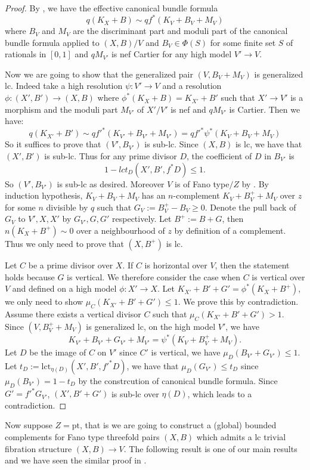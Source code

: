 \documentclass[letterpaper,reqno,12pt]{amsart}
\numberwithin{equation}{section}
\theoremstyle{plain}
\begin{document}
\begin{proof}
    By , we have the effective canonical bundle formula 
    \[q(K_X+B)\sim qf^*(K_V+B_V+M_V)\]
    where $B_V$ and $M_V$ are the discriminant part and moduli part of the canonical bundle formula applied to $(X,B)/V$ and $B_V\in\Phi(S)$ for some finite set $S$ of rationals in $[0,1]$ and $qM_{V'}$ is nef Cartier for any high model $V'\to V$.

    Now we are going to show that the generalized pair $(V,B_V+M_V)$  is generalized lc. Indeed take a high resolution $\psi:V'\to V$ and a resolution $\phi:(X',B')\to (X,B)$ where $\phi^*(K_X+B)=K_{X'}+B'$ such that $X'\to V'$ is a morphism and the moduli part $M_{V'}$ of $X'/V'$ is nef and $qM_{V'}$ is Cartier. Then we have:
    \[q(K_{X'}+B')\sim qf'^*(K_{V'}+B_{V'}+M_{V'})=qf'^*\psi^*(K_V+B_V+M_V)\]
    So it suffices to prove that $(V',B_{V'})$ is sub-lc. Since $(X,B)$ is lc, we have that $(X',B')$ is sub-lc. Thus for any prime divisor $D$, the coefficient of $D$ in $B_{V'}$ is \[1-lct_D(X',B',f^*D)\leq 1.\] So $(V',B_{V'})$ is sub-lc as desired. Moreover $V$ is of Fano type$/Z$ by . By induction hypothesis, $K_V+B_V+M_V$ has an $n$-complement $K_V+B^+_V+M_V$ over $z$ for some $n$ divisible by $q$ such that $G_V:=B^+_V-B_V\geq0$. Denote the pull back of $G_V$ to $V',X,X'$ by $G_{V'},G,G'$ respectively. Let $B^+:=B+G$, then $n(K_X+B^+)\sim 0$ over a neighbourhood of $z$ by definition of a complement. Thus we only need to prove that $(X,B^+)$ is lc.

    Let $C$ be a prime divisor over $X$. If $C$ is horizontal over $V$, then the statement holds  because $G$ is vertical. We therefore consider the case when $C$ is vertical over $V$ and defined on a high model $\phi:X'\to X$. Let $K_{X'}+B'+G'=\phi^*(K_X+B^+)$, we only need to show $\mu_C(K_{X'}+B'+G')\leq 1$. We prove this by contradiction. Assume there exists a vertical divisor $C$ such that $\mu_C(K_{X'}+B'+G')>1$. Since $(V,B_V^++M_V)$ is generalized lc, on the high model $V'$, we have
    \[K_{V'}+B_{V'}+G_{V'}+M_{V'}=\psi^*(K_V+B^+_V+M_V).\]
    Let $D$ be the image of $C$ on $V'$ since $C'$ is vertical, we have $\mu_D(B_{V'}+G_{V'})\leq 1$. Let $t_D:=\text{lct}_{\eta(D)}(X',B',f'^*D)$, we have that $\mu_D(G_{V'})\leq t_D$ since $\mu_D(B_{V'})=1-t_D$ by the constrcution of canonical bundle formula. Since $G'=f'^*G_{V'}$, $(X',B'+G')$ is sub-lc over $\eta(D)$, which leads to a contradiction.
\end{proof}
Now suppose $Z=\text{pt}$, that is we are going to construct a (global) bounded complements for Fano type threefold pairs $(X,B)$ which admits a lc trivial fibration structure $(X,B)\to V$. The following result is one of our main results and we have seen the similar proof in .
\end{document}
